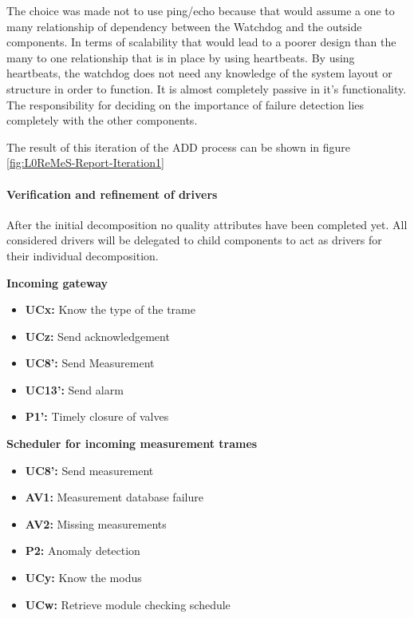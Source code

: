\begin{itemize}
The choice was made not to use ping/echo because that would assume a one to many relationship of dependency between the Watchdog and the outside components. 
In terms of scalability that would lead to a poorer design than the many to one relationship that is in place by using heartbeats. By using heartbeats, the watchdog does not need any knowledge of the system layout or structure in order to function. It is almost completely passive in it's functionality. The responsibility for deciding on the importance of failure detection lies completely with the other components.
	
\end{itemize}
The result of this iteration of the ADD process can be shown in figure \ref{fig:L0ReMeS-Report-Iteration1}


\paragraph{Verification and refinement of drivers}
After the initial decomposition no quality attributes have been completed yet. All considered drivers will be delegated to child components to act as drivers for their individual decomposition.

\textbf{Incoming gateway}
\begin{itemize}
	\item \textbf{UCx: } Know the type of the trame
	\item \textbf{UCz: } Send acknowledgement
	\item \textbf{UC8': } Send Measurement
	\item \textbf{UC13': } Send alarm
	\item \textbf{P1': } Timely closure of valves
\end{itemize}

\textbf{Scheduler for incoming measurement trames}
\begin{itemize}
	\item \textbf{UC8': } Send measurement
	\item \textbf{AV1: } Measurement database failure
	\item \textbf{AV2: } Missing measurements
	\item \textbf{P2: } Anomaly detection
	\item \textbf{UCy: } Know the modus
	\item \textbf{UCw: } Retrieve module checking schedule
\end{itemize}

